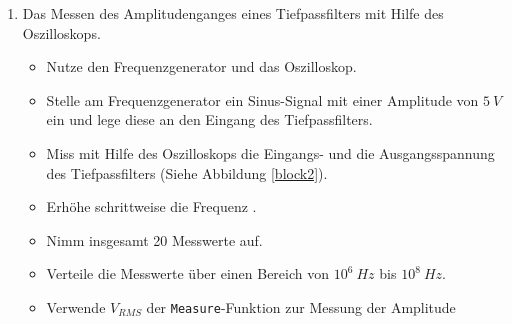 \begin{enumerate}
	\item Das Messen des Amplitudenganges eines Tiefpassfilters mit Hilfe des Oszilloskops.
		\begin{itemize}
			\item Nutze den Frequenzgenerator und das Oszilloskop.
			\item Stelle am Frequenzgenerator ein Sinus-Signal mit einer Amplitude von
        $5~V$ ein und lege diese an den Eingang des Tiefpassfilters.
			\item Miss mit Hilfe des Oszilloskops die Eingangs- und die Ausgangsspannung des Tiefpassfilters (Siehe Abbildung \ref{block2}).
			\item Erhöhe schrittweise die Frequenz .
			\item Nimm insgesamt 20 Messwerte auf.
			\item Verteile die Messwerte über einen Bereich von $10^6~Hz$ bis $10^8~Hz$.
			\item Verwende \texttt{$V_{RMS}$} der \texttt{Measure}-Funktion zur Messung der Amplitude

\end{itemize}
\end{enumerate}
